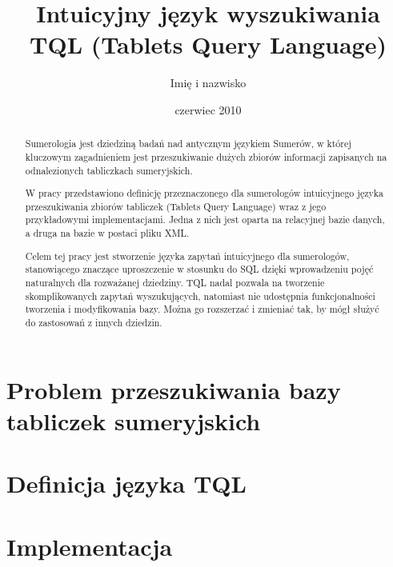 \documentclass{pracamgr}
\author{Imię i nazwisko}
\title{Intuicyjny język wyszukiwania TQL (Tablets Query Language)}
\date{czerwiec 2010}
\begin{document}
\maketitle

\begin{abstract}
Sumerologia jest dziedziną badań nad antycznym językiem Sumerów, w której
kluczowym zagadnieniem jest przeszukiwanie dużych zbiorów informacji
zapisanych na odnalezionych tabliczkach sumeryjskich.


W pracy przedstawiono definicję przeznaczonego dla sumerologów intuicyjnego
języka przeszukiwania zbiorów tabliczek (Tablets Query Language) wraz z jego
przykładowymi implementacjami. Jedna z nich jest oparta na relacyjnej bazie danych, a druga na bazie w postaci pliku XML.

Celem tej pracy jest stworzenie języka zapytań intuicyjnego dla sumerologów,
stanowiącego znaczące uproszczenie w stosunku do SQL dzięki wprowadzeniu pojęć 
naturalnych dla rozważanej dziedziny. TQL nadal
pozwala na tworzenie skomplikowanych zapytań wyszukujących, natomiast nie 
udostępnia funkcjonalności tworzenia i modyfikowania bazy. Można go rozszerzać 
i zmieniać tak, by mógł służyć do zastosowań z innych dziedzin.
\end{abstract}

\tableofcontents

\part{Problem przeszukiwania bazy tabliczek sumeryjskich}




\part{Definicja języka TQL}


\part{Implementacja}





\end{document}
